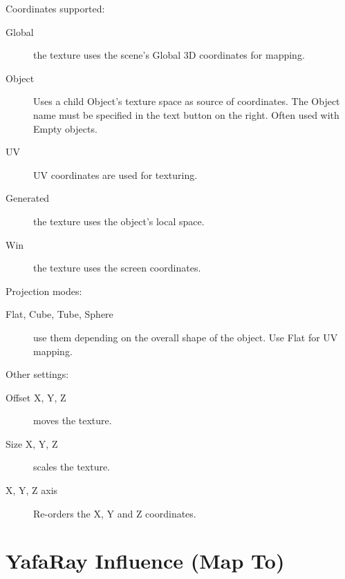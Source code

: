 Coordinates supported:
\begin{description}
\item[Global] the texture uses the scene's Global 3D coordinates for mapping.
\item[Object] Uses a child Object's texture space as source of coordinates. The Object name must be specified in the text button on the right. Often used with Empty objects.
\item[UV] UV coordinates are used for texturing.
\item[Generated] the texture uses the object's local space.
\item[Win] the texture uses the screen coordinates.
\end{description}

Projection modes:

\begin{description}
\item[Flat, Cube, Tube, Sphere] use them depending on the overall shape of the object. Use Flat for UV mapping.
\end{description}

Other settings:

\begin{description}
\item[Offset X, Y, Z] moves the texture.
\item[Size X, Y, Z] scales the texture.
\item[X, Y, Z axis] Re-orders the X, Y and Z coordinates.
\end{description}


\section{YafaRay Influence (Map To)}


